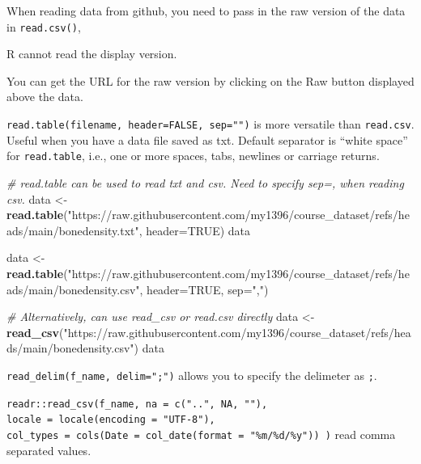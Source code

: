 \documentclass[
  a4paper,
  twoside,
  openright]{book}
\newenvironment{Shaded}{\begin{snugshade}}{\end{snugshade}}
\newcommand{\AttributeTok}[1]{\textcolor[rgb]{0.13,0.29,0.53}{#1}}
\newcommand{\CommentTok}[1]{\textcolor[rgb]{0.56,0.35,0.01}{\textit{#1}}}
\newcommand{\ConstantTok}[1]{\textcolor[rgb]{0.56,0.35,0.01}{#1}}
\newcommand{\FunctionTok}[1]{\textcolor[rgb]{0.13,0.29,0.53}{\textbf{#1}}}
\newcommand{\NormalTok}[1]{#1}
\newcommand{\OtherTok}[1]{\textcolor[rgb]{0.56,0.35,0.01}{#1}}
\newcommand{\StringTok}[1]{\textcolor[rgb]{0.31,0.60,0.02}{#1}}
\theoremstyle{definition}
\theoremstyle{definition}
\theoremstyle{definition}
\theoremstyle{definition}
\theoremstyle{remark}
\begin{document}
When reading data from github, you need to pass in the {raw version} of the data in \texttt{read.csv()},

R cannot read the display version.

You can get the URL for the raw version by clicking on the Raw button displayed above the data.

\texttt{read.table(filename,\ header=FALSE,\ sep="")} is more versatile than \texttt{read.csv}. Useful when you have a data file saved as txt.
Default separator is ``white space'' for \texttt{read.table}, i.e., one or more spaces, tabs, newlines or carriage returns.

\begin{Shaded}
\begin{Highlighting}[]
\CommentTok{\# read.table can be used to read txt and csv. Need to specify sep=\textquotesingle{},\textquotesingle{} when reading csv.}
\NormalTok{data }\OtherTok{\textless{}{-}} \FunctionTok{read.table}\NormalTok{(}\StringTok{"https://raw.githubusercontent.com/my1396/course\_dataset/refs/heads/main/bonedensity.txt"}\NormalTok{, }\AttributeTok{header=}\ConstantTok{TRUE}\NormalTok{)}
\NormalTok{data}

\NormalTok{data }\OtherTok{\textless{}{-}} \FunctionTok{read.table}\NormalTok{(}\StringTok{"https://raw.githubusercontent.com/my1396/course\_dataset/refs/heads/main/bonedensity.csv"}\NormalTok{, }\AttributeTok{header=}\ConstantTok{TRUE}\NormalTok{, }\AttributeTok{sep=}\StringTok{","}\NormalTok{)}

\CommentTok{\# Alternatively, can use read\_csv or read.csv directly}
\NormalTok{data }\OtherTok{\textless{}{-}} \FunctionTok{read\_csv}\NormalTok{(}\StringTok{"https://raw.githubusercontent.com/my1396/course\_dataset/refs/heads/main/bonedensity.csv"}\NormalTok{)}
\NormalTok{data}
\end{Highlighting}
\end{Shaded}

\texttt{read\_delim(f\_name,\ delim=";")} allows you to specify the delimeter as \texttt{;}.

\texttt{readr::read\_csv(f\_name,\ na\ =\ c("..",\ NA,\ ""),}
\texttt{locale\ =\ locale(encoding\ =\ "UTF-8"),}
\texttt{col\_types\ =\ cols(Date\ =\ col\_date(format\ =\ "\%m/\%d/\%y"))\ )} read {comma separated values}.
\end{document}
